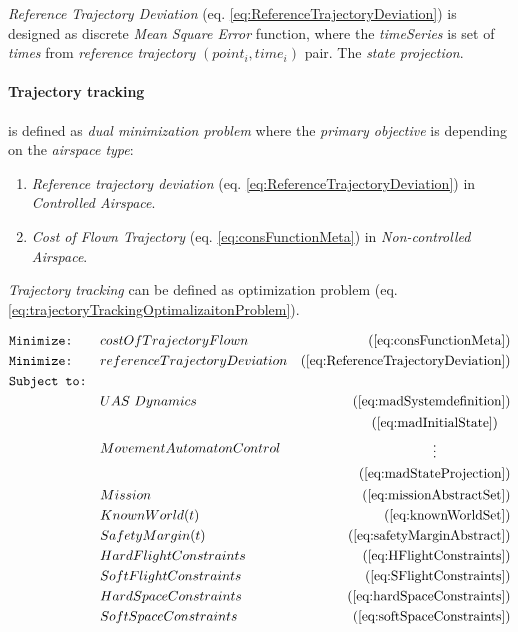 \emph{Reference Trajectory Deviation} (eq. \ref{eq:ReferenceTrajectoryDeviation}) is designed as discrete \emph{Mean Square Error} function, where the \emph{timeSeries} is set of \emph{times} from \emph{reference trajectory} $(point_i,time_i)$ pair. The \emph{state projection}.

\paragraph{Trajectory tracking} is defined as \emph{dual minimization problem} where the \emph{primary objective} is depending on the \emph{airspace type}:

\begin{enumerate}
    \item \emph{Reference trajectory deviation} (eq. \ref{eq:ReferenceTrajectoryDeviation}) in \emph{Controlled Airspace}.
    
    \item \emph{Cost of Flown Trajectory} (eq. \ref{eq:consFunctionMeta}) in \emph{Non-controlled Airspace}.
\end{enumerate}

\noindent\emph{Trajectory tracking} can be defined as optimization problem (eq. \ref{eq:trajectoryTrackingOptimalizaitonProblem}). 

\begin{equation}\label{eq:trajectoryTrackingOptimalizaitonProblem}
    \begin{aligned}
         &\texttt{Minimize:} && costOfTrajectoryFlown &(\ref{eq:consFunctionMeta})\\
         &\texttt{Minimize:} && reference Trajectory Deviation
         &(\ref{eq:ReferenceTrajectoryDeviation})\\
         &\texttt{Subject to:} &&&\\
         &&&UAS\text{ }Dynamics&(\ref{eq:madSystemdefinition})\\
         &&&MovementAutomatonControl&\begin{gathered}(\ref{eq:madInitialState})\\\vdots\\(\ref{eq:madStateProjection})\end{gathered}\\
         &&&Mission&(\ref{eq:missionAbstractSet})\\
         &&&KnownWorld(t)&(\ref{eq:knownWorldSet})\\
         &&&SafetyMargin(t)&(\ref{eq:safetyMarginAbstract})\\
         &&&HardFlightConstraints&(\ref{eq:HFlightConstraints})\\
         &&&SoftFlightConstraints&(\ref{eq:SFlightConstraints})\\
         &&&HardSpaceConstraints&(\ref{eq:hardSpaceConstraints})\\
         &&&SoftSpaceConstraints&(\ref{eq:softSpaceConstraints})\\
    \end{aligned}
\end{equation}

